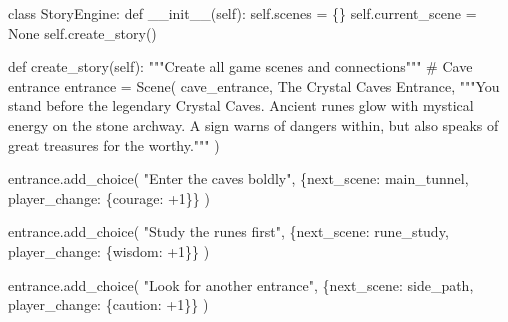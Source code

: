 \documentclass[
  letterpaper,
  DIV=11,
  numbers=noendperiod,
  oneside]{scrreprt}
\newenvironment{Shaded}{}{}
\newcommand{\CommentTok}[1]{\textcolor[rgb]{0.42,0.45,0.49}{#1}}
\newcommand{\DecValTok}[1]{\textcolor[rgb]{0.00,0.36,0.77}{#1}}
\newcommand{\FunctionTok}[1]{\textcolor[rgb]{0.44,0.26,0.76}{#1}}
\newcommand{\KeywordTok}[1]{\textcolor[rgb]{0.84,0.23,0.29}{#1}}
\newcommand{\NormalTok}[1]{\textcolor[rgb]{0.14,0.16,0.18}{#1}}
\newcommand{\OperatorTok}[1]{\textcolor[rgb]{0.14,0.16,0.18}{#1}}
\newcommand{\StringTok}[1]{\textcolor[rgb]{0.01,0.18,0.38}{#1}}
\newcommand{\VariableTok}[1]{\textcolor[rgb]{0.89,0.38,0.04}{#1}}
\begin{document}
\begin{Shaded}
\begin{Highlighting}[]
\KeywordTok{class}\NormalTok{ StoryEngine:}
    \KeywordTok{def} \FunctionTok{\_\_init\_\_}\NormalTok{(}\VariableTok{self}\NormalTok{):}
        \VariableTok{self}\NormalTok{.scenes }\OperatorTok{=}\NormalTok{ \{\}}
        \VariableTok{self}\NormalTok{.current\_scene }\OperatorTok{=} \VariableTok{None}
        \VariableTok{self}\NormalTok{.create\_story()}
    
    \KeywordTok{def}\NormalTok{ create\_story(}\VariableTok{self}\NormalTok{):}
        \CommentTok{"""Create all game scenes and connections"""}
        \CommentTok{\# Cave entrance}
\NormalTok{        entrance }\OperatorTok{=}\NormalTok{ Scene(}
            \StringTok{\textquotesingle{}cave\_entrance\textquotesingle{}}\NormalTok{,}
            \StringTok{\textquotesingle{}The Crystal Caves Entrance\textquotesingle{}}\NormalTok{,}
            \StringTok{"""You stand before the legendary Crystal Caves. Ancient runes }
\StringTok{            glow with mystical energy on the stone archway. A sign warns }
\StringTok{            of dangers within, but also speaks of great treasures for the }
\StringTok{            worthy."""}
\NormalTok{        )}
        
\NormalTok{        entrance.add\_choice(}
            \StringTok{"Enter the caves boldly"}\NormalTok{,}
\NormalTok{            \{}\StringTok{\textquotesingle{}next\_scene\textquotesingle{}}\NormalTok{: }\StringTok{\textquotesingle{}main\_tunnel\textquotesingle{}}\NormalTok{, }\StringTok{\textquotesingle{}player\_change\textquotesingle{}}\NormalTok{: \{}\StringTok{\textquotesingle{}courage\textquotesingle{}}\NormalTok{: }\OperatorTok{+}\DecValTok{1}\NormalTok{\}\}}
\NormalTok{        )}
        
\NormalTok{        entrance.add\_choice(}
            \StringTok{"Study the runes first"}\NormalTok{,}
\NormalTok{            \{}\StringTok{\textquotesingle{}next\_scene\textquotesingle{}}\NormalTok{: }\StringTok{\textquotesingle{}rune\_study\textquotesingle{}}\NormalTok{, }\StringTok{\textquotesingle{}player\_change\textquotesingle{}}\NormalTok{: \{}\StringTok{\textquotesingle{}wisdom\textquotesingle{}}\NormalTok{: }\OperatorTok{+}\DecValTok{1}\NormalTok{\}\}}
\NormalTok{        )}
        
\NormalTok{        entrance.add\_choice(}
            \StringTok{"Look for another entrance"}\NormalTok{,}
\NormalTok{            \{}\StringTok{\textquotesingle{}next\_scene\textquotesingle{}}\NormalTok{: }\StringTok{\textquotesingle{}side\_path\textquotesingle{}}\NormalTok{, }\StringTok{\textquotesingle{}player\_change\textquotesingle{}}\NormalTok{: \{}\StringTok{\textquotesingle{}caution\textquotesingle{}}\NormalTok{: }\OperatorTok{+}\DecValTok{1}\NormalTok{\}\}}
\NormalTok{        )}
        

\end{Highlighting}
\end{Shaded}
\end{document}
